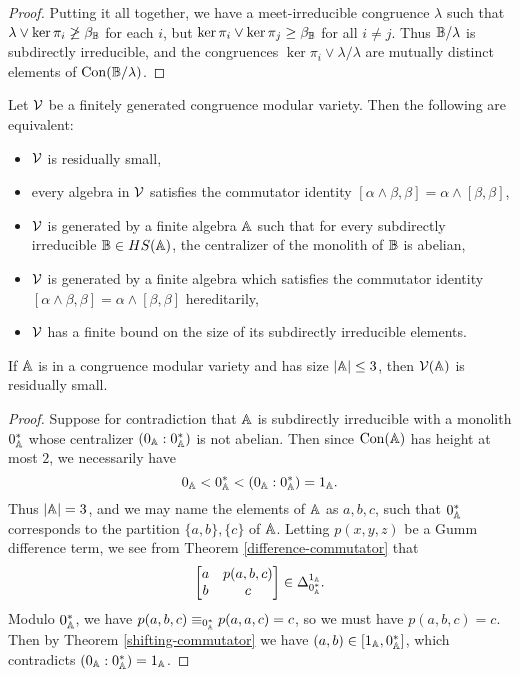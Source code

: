 \documentclass[letterpaper,11pt]{article}
\DeclareMathOperator{\Con}{Con}
\begin{document}
\begin{proof}
Putting it all together, we have a meet-irreducible congruence $\lambda$ such that $\lambda \vee \ker \pi_i \not\ge \beta_{\mathbb{B}}$ for each $i$, but $\ker \pi_i \vee \ker \pi_j \ge \beta_{\mathbb{B}}$ for all $i \ne j$. Thus $\mathbb{B}/\lambda$ is subdirectly irreducible, and the congruences $\ker \pi_i \vee \lambda/\lambda$ are mutually distinct elements of $\Con(\bB/\lambda)$.
\end{proof}

\begin{cor}\label{residual-crit} Let $\mathcal{V}$ be a finitely generated congruence modular variety. Then the following are equivalent:
\begin{itemize}
\item $\mathcal{V}$ is residually small,

\item every algebra in $\mathcal{V}$ satisfies the commutator identity $[\alpha \wedge \beta, \beta] = \alpha \wedge [\beta,\beta]$,

\item $\mathcal{V}$ is generated by a finite algebra $\mathbb{A}$ such that for every subdirectly irreducible $\mathbb{B} \in HS(\mathbb{A})$, the centralizer of the monolith of $\mathbb{B}$ is abelian,

\item $\mathcal{V}$ is generated by a finite algebra which satisfies the commutator identity $[\alpha \wedge \beta, \beta] = \alpha \wedge [\beta,\beta]$ hereditarily,

\item $\mathcal{V}$ has a finite bound on the size of its subdirectly irreducible elements.
\end{itemize}
\end{cor}

\begin{cor} If $\mathbb{A}$ is in a congruence modular variety and has size $|\mathbb{A}| \le 3$, then $\mathcal{V}(\mathbb{A})$ is residually small.
\end{cor}
\begin{proof} Suppose for contradiction that $\mathbb{A}$ is subdirectly irreducible with a monolith $0_{\mathbb{A}}^*$ whose centralizer $(0_{\mathbb{A}} : 0_{\mathbb{A}}^*)$ is not abelian. Then since $\Con(\bA)$ has height at most $2$, we necessarily have
\[
0_{\mathbb{A}} < 0_{\mathbb{A}}^* < (0_{\mathbb{A}} : 0_{\mathbb{A}}^*) = 1_{\mathbb{A}}.
\]
Thus $|\mathbb{A}| = 3$, and we may name the elements of $\mathbb{A}$ as $a,b,c$, such that $0_{\mathbb{A}}^*$ corresponds to the partition $\{a,b\},\{c\}$ of $\mathbb{A}$. Letting $p(x,y,z)$ be a Gumm difference term, we see from Theorem \ref{difference-commutator} that
\[
\begin{bmatrix} a & p(a,b,c)\\ b & c\end{bmatrix} \in \Delta_{0_{\mathbb{A}}^*}^{1_{\mathbb{A}}}.
\]
Modulo $0_{\mathbb{A}}^*$, we have $p(a,b,c) \equiv_{0_{\mathbb{A}}^*} p(a,a,c) = c$, so we must have $p(a,b,c) = c$. Then by Theorem \ref{shifting-commutator} we have $(a,b) \in [1_{\mathbb{A}}, 0_{\mathbb{A}}^*]$, which contradicts $(0_{\mathbb{A}} : 0_{\mathbb{A}}^*) = 1_{\mathbb{A}}$.
\end{proof}
\end{document}
